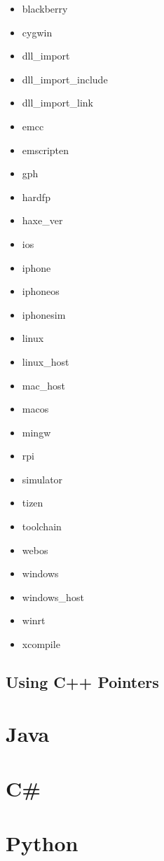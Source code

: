 \begin{itemize}
	\item blackberry
	\item cygwin
	\item dll_import
	\item dll_import_include
	\item dll_import_link
	\item emcc
	\item emscripten
	\item gph
	\item hardfp
	\item haxe_ver
	\item ios
	\item iphone
	\item iphoneos
	\item iphonesim
	\item linux
	\item linux_host
	\item mac_host
	\item macos
	\item mingw
	\item rpi
	\item simulator
	\item tizen
	\item toolchain
	\item webos
	\item windows
	\item windows_host
	\item winrt
	\item xcompile
\end{itemize}

\subsection{Using C++ Pointers}
\label{target-cpp-pointers}

\section{Java}
\label{target-java}

\section{C\#}
\label{target-cs}

\section{Python}
\label{target-python}
